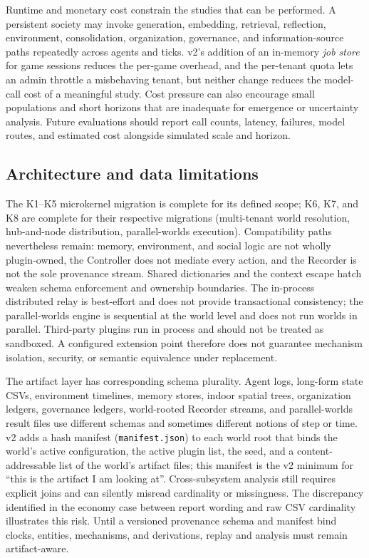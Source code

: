 Runtime and monetary cost constrain the studies that can be performed.
A persistent society may invoke generation, embedding, retrieval,
reflection, environment, consolidation, organization, governance, and
information-source paths repeatedly across agents and ticks.  v2's
addition of an in-memory \emph{job store} for game sessions reduces
the per-game overhead, and the per-tenant quota lets an admin throttle
a misbehaving tenant, but neither change reduces the model-call cost
of a meaningful study.  Cost pressure can also encourage small
populations and short horizons that are inadequate for emergence or
uncertainty analysis.  Future evaluations should report call counts,
latency, failures, model routes, and estimated cost alongside simulated
scale and horizon.

\subsection{Architecture and data limitations}

The K1--K5 microkernel migration is complete for its defined scope;
K6, K7, and K8 are complete for their respective migrations
(multi-tenant world resolution, hub-and-node distribution,
parallel-worlds execution).  Compatibility paths nevertheless remain:
memory, environment, and social logic are not wholly plugin-owned, the
Controller does not mediate every action, and the Recorder is not the
sole provenance stream.  Shared dictionaries and the context escape
hatch weaken schema enforcement and ownership boundaries.  The
in-process distributed relay is best-effort and does not provide
transactional consistency; the parallel-worlds engine is sequential at
the world level and does not run worlds in parallel.  Third-party
plugins run in process and should not be treated as sandboxed.  A
configured extension point therefore does not guarantee mechanism
isolation, security, or semantic equivalence under replacement.

The artifact layer has corresponding schema plurality.  Agent logs,
long-form state CSVs, environment timelines, memory stores, indoor
spatial trees, organization ledgers, governance ledgers, world-rooted
Recorder streams, and parallel-worlds result files use different
schemas and sometimes different notions of step or time.  v2 adds a
hash manifest (\texttt{manifest.json}) to each world root that binds
the world's active configuration, the active plugin list, the seed,
and a content-addressable list of the world's artifact files; this
manifest is the v2 minimum for ``this is the artifact I am looking
at''.  Cross-subsystem analysis still requires explicit joins and can
silently misread cardinality or missingness.  The discrepancy
identified in the economy case between report wording and raw CSV
cardinality illustrates this risk.  Until a versioned provenance
schema and manifest bind clocks, entities, mechanisms, and derivations,
replay and analysis must remain artifact-aware.

